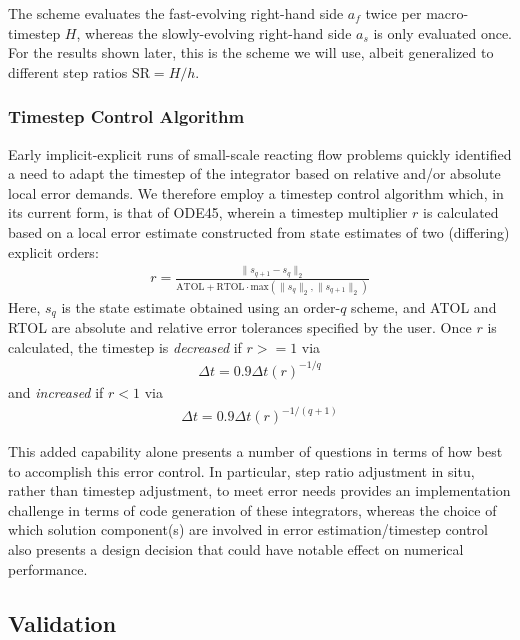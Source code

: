 The scheme evaluates the fast-evolving right-hand side $a_{f}$ twice per
macro-timestep $H$, whereas the slowly-evolving right-hand side $a_{s}$ is only
evaluated once.  For the results shown later, this is the scheme we will use,
albeit generalized to different step ratios $\text{SR} = H/h$.  

\subsubsection{Timestep Control Algorithm}

Early implicit-explicit runs of small-scale reacting flow problems
quickly identified a need to adapt the timestep of the integrator based
on relative and/or absolute local error demands. We therefore employ a
timestep control algorithm which, in its current form, is that of ODE45, wherein
a timestep multiplier $r$ is calculated based on a local error estimate constructed from
state estimates of two (differing) explicit orders:
\begin{align}
r = \frac{\|s_{q+1} - s_{q}\|_{2}}{\text{ATOL} + \text{RTOL} \cdot \text{max}(\|s_{q}\|_{2}, \|s_{q+1}\|_{2})}
\end{align}
Here, $s_{q}$ is the state estimate obtained using an order-$q$ scheme, and ATOL and RTOL are absolute and
relative error tolerances specified by the user. Once $r$ is calculated, the timestep is \emph{decreased} if
$r>=1$ via
\begin{align}
\Delta t = 0.9\Delta t (r)^{-1/q}
\end{align}
and \emph{increased} if $r<1$ via
\begin{align}
\Delta t = 0.9\Delta t (r)^{-1/(q+1)}
\end{align}

This added capability alone presents a number of questions in terms of how 
best to accomplish this error control. In particular, step ratio adjustment in situ,
rather than timestep adjustment, to meet error needs provides an implementation
challenge in terms of code generation of these integrators, whereas the choice of
which solution component(s) are involved in error estimation/timestep control also
presents a design decision that could have notable effect on numerical performance.

\subsection{Validation}

